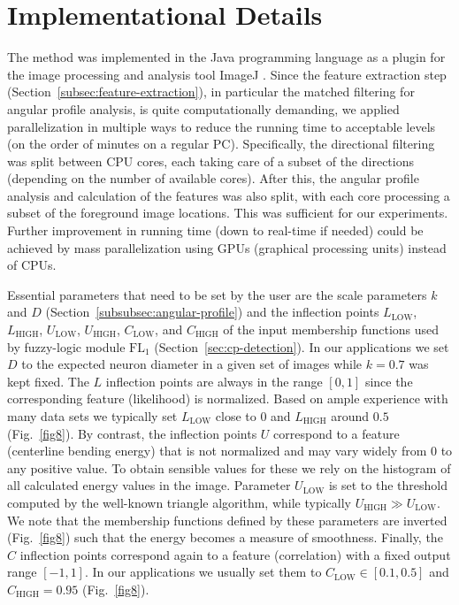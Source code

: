 \section{Implementational Details}
\label{sec:implementation-details}
The method was implemented in the Java programming language as a plugin for the image processing and analysis tool ImageJ \cite{abramoff2004image,Schneider-2012}. Since the feature extraction step (Section~\ref{subsec:feature-extraction}), in particular the matched filtering for  angular profile analysis, is quite computationally demanding, we applied parallelization in multiple ways to reduce the running time to acceptable levels (on the order of minutes on a regular PC). Specifically, the directional filtering was split between CPU cores, each taking care of a subset of the directions (depending on the number of available cores). After this, the angular profile analysis and calculation of the features was also split, with each core processing a subset of the foreground image locations. This was sufficient for our experiments. Further improvement in running time (down to real-time if needed) could be achieved by mass parallelization using GPUs (graphical processing units) instead of CPUs.

Essential parameters that need to be set by the user are the scale parameters $k$ and $D$ (Section~\ref{subsubsec:angular-profile}) and the inflection points $L_{\mathrm{LOW}}$, $L_{\mathrm{HIGH}}$, $U_{\mathrm{LOW}}$, $U_{\mathrm{HIGH}}$, $C_{\mathrm{LOW}}$, and $C_{\mathrm{HIGH}}$ of the input membership functions used by fuzzy-logic module $\textrm{FL}_{1}$ (Section~\ref{sec:cp-detection}). In our applications we set $D$ to the expected neuron diameter in a given set of images while $k=0.7$ was kept fixed. The $L$ inflection points are always in the range $[0,1]$ since the corresponding feature (likelihood) is normalized. Based on ample experience with many data sets we typically set $L_{\mathrm{LOW}}$ close to 0 and $L_{\mathrm{HIGH}}$ around $0.5$ (Fig.~\ref{fig8}). By contrast, the inflection points $U$ correspond to a feature (centerline bending energy) that is not normalized and may vary widely from $0$ to any positive value. To obtain sensible values for these we rely on the histogram of all calculated energy values in the image. Parameter $U_{\mathrm{LOW}}$ is set to the threshold computed by the well-known triangle algorithm, while typically $U_{\mathrm{HIGH}}\gg U_{\mathrm{LOW}}$. We note that the membership functions defined by these parameters are inverted (Fig.~\ref{fig8}) such that the energy becomes a measure of smoothness. Finally, the $C$ inflection points correspond again to a feature (correlation) with a fixed output range $[-1,1]$. In our applications we usually set them to $C_{\mathrm{LOW}}\in[0.1,0.5]$ and $C_{\mathrm{HIGH}}=0.95$  (Fig.~\ref{fig8}).

